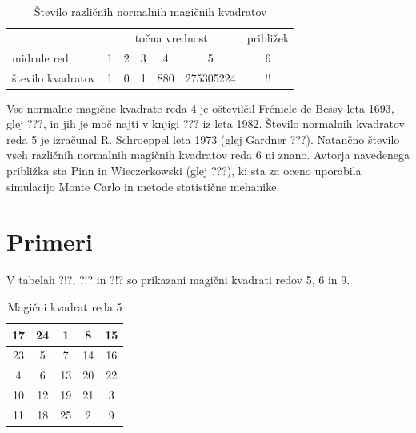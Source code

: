 \documentclass[a4paper,12pt]{article}
\begin{document}
\begin{table}
   \centering
   \caption{Število različnih normalnih magičnih kvadratov}
   \begin{tabular}{lcccccc}\toprule 
      & \multicolumn{5}{c}{točna vrednost} & približek \\midrule
      red & 1 & 2 & 3 & 4 & 5 & 6 \\
      število kvadratov & 1 & 0 & 1 & 880 & 275305224 & !! \\\bottomrule
   \end{tabular}
   \label{table:stevila}
\end{table}

Vse normalne magične kvadrate reda 4 je oštevilčil Frénicle de Bessy
leta 1693, glej ???, in jih je moč najti v knjigi ???
iz leta 1982. Število normalnih kvadratov reda 5 je izračunal
R. Schroeppel leta 1973 (glej Gardner ???).
Natančno število vseh različnih normalnih magičnih kvadratov reda 6 ni znano.
Avtorja navedenega približka sta Pinn in Wieczerkowski (glej ???), ki
sta za oceno uporabila simulacijo Monte Carlo in metode statistične mehanike.
\label{bessy} \label{berlekamp} \label{gardner} \label{pinn}


\section{Primeri}

V tabelah ?!?, ?!? in ?!? so prikazani
magični kvadrati redov 5, 6 in 9.

\begin{table}[!ht]
   \centering
   \caption{Magični kvadrat reda 5}
   \label{table:mag5}
   \large
   \begin{tabular}{||c|c|c|c|c|}
   \hline
   17 & 24 &  1 &  8 & 15 \\ \hline
   23 &  5 &  7 & 14 & 16 \\ \hline
    4 &  6 & 13 & 20 & 22 \\ \hline
   10 & 12 & 19 & 21 &  3 \\ \hline
   11 & 18 & 25 &  2 &  9 \\ \hline
   \end{tabular}
\end{table}
\end{document}
